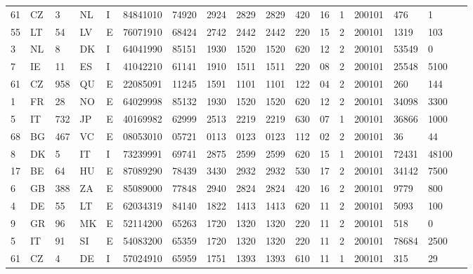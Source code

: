 {\begin{tabular}{p{2.5cm}p{2.5cm}p{2cm}p{2cm}p{2cm}p{2cm}p{2cm}p{2cm}p{2cm}p{2cm}p{2cm}p{2cm}p{2cm}p{2cm}p{2cm}p{2cm}p{2cm}}
 61 & CZ & 3 & NL & I & 84841010 & 74920 & 2924 & 2829 & 2829 & 420 & 16 & 1 & 200101 & 476 & 1 \\
 55 & LT & 54 & LV & E & 76071910 & 68424 & 2742 & 2442 & 2442 & 220 & 15 & 2 & 200101 & 1319 & 103 \\
 3 & NL & 8 & DK & I & 64041990 & 85151 & 1930 & 1520 & 1520 & 620 & 12 & 2 & 200101 & 53549 & 0 \\
 7 & IE & 11 & ES & I & 41042210 & 61141 & 1910 & 1511 & 1511 & 220 & 08 & 2 & 200101 & 25548 & 5100 \\
 61 & CZ & 958 & QU & E & 22085091 & 11245 & 1591 & 1101 & 1101 & 122 & 04 & 2 & 200101 & 260 & 144 \\
 1 & FR & 28 & NO & E & 64029998 & 85132 & 1930 & 1520 & 1520 & 620 & 12 & 2 & 200101 & 34098 & 3300 \\
 5 & IT & 732 & JP & E & 40169982 & 62999 & 2513 & 2219 & 2219 & 630 & 07 & 1 & 200101 & 36866 & 1000 \\
 68 & BG & 467 & VC & E & 08053010 & 05721 & 0113 & 0123 & 0123 & 112 & 02 & 2 & 200101 & 36 & 44 \\
 8 & DK & 5 & IT & I & 73239991 & 69741 & 2875 & 2599 & 2599 & 620 & 15 & 1 & 200101 & 72431 & 48100 \\
 17 & BE & 64 & HU & E & 87089290 & 78439 & 3430 & 2932 & 2932 & 530 & 17 & 2 & 200101 & 34142 & 7500 \\
 6 & GB & 388 & ZA & E & 85089000 & 77848 & 2940 & 2824 & 2824 & 420 & 16 & 2 & 200101 & 9779 & 800 \\
 4 & DE & 55 & LT & E & 62034319 & 84140 & 1822 & 1413 & 1413 & 620 & 11 & 2 & 200101 & 5093 & 100 \\
 9 & GR & 96 & MK & E & 52114200 & 65263 & 1720 & 1320 & 1320 & 220 & 11 & 2 & 200101 & 518 & 0 \\
 5 & IT & 91 & SI & E & 54083200 & 65359 & 1720 & 1320 & 1320 & 220 & 11 & 2 & 200101 & 78684 & 2500 \\
 61 & CZ & 4 & DE & I & 57024910 & 65959 & 1751 & 1393 & 1393 & 610 & 11 & 1 & 200101 & 315 & 29 \\ 
 \bottomrule
\end{tabular}
}
